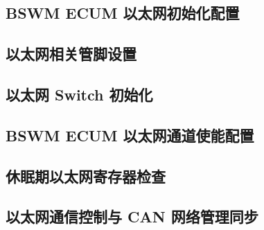 \subsection{BSWM ECUM 以太网初始化配置}
\subsection{以太网相关管脚设置}
\subsection{以太网 Switch 初始化}
\subsection{BSWM ECUM 以太网通道使能配置}
\subsection{休眠期以太网寄存器检查}
\subsection{以太网通信控制与 CAN 网络管理同步}
